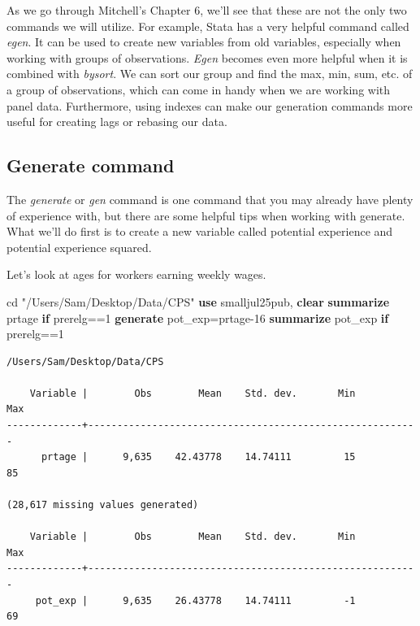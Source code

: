 \documentclass[
]{book}
\newenvironment{Shaded}{\begin{snugshade}}{\end{snugshade}}
\newcommand{\KeywordTok}[1]{\textcolor[rgb]{0.13,0.29,0.53}{\textbf{#1}}}
\newcommand{\NormalTok}[1]{#1}
\newcommand{\StringTok}[1]{\textcolor[rgb]{0.31,0.60,0.02}{#1}}
\begin{document}
As we go through Mitchell's Chapter 6, we'll see that these are not the only two commands we will utilize. For example, Stata has a very helpful command called \emph{egen}. It can be used to create new variables from old variables, especially when working with groups of observations. \emph{Egen} becomes even more helpful when it is combined with \emph{bysort}. We can sort our group and find the max, min, sum, etc. of a group of observations, which can come in handy when we are working with panel data. Furthermore, using indexes can make our generation commands more useful for creating lags or rebasing our data.

\subsection{Generate command}\label{generate-command}

The \emph{generate} or \emph{gen} command is one command that you may already have plenty of experience with, but there are some helpful tips when working with generate. What we'll do first is to create a new variable called potential experience and potential experience squared.

Let's look at ages for workers earning weekly wages.

\begin{Shaded}
\begin{Highlighting}[]
\NormalTok{cd }\StringTok{"/Users/Sam/Desktop/Data/CPS"}
\KeywordTok{use}\NormalTok{ smalljul25pub, }\KeywordTok{clear}
\KeywordTok{summarize}\NormalTok{ prtage }\KeywordTok{if}\NormalTok{ prerelg==1}
\KeywordTok{generate}\NormalTok{ pot\_exp=prtage{-}16}
\KeywordTok{summarize}\NormalTok{ pot\_exp }\KeywordTok{if}\NormalTok{ prerelg==1}
\end{Highlighting}
\end{Shaded}

\begin{verbatim}
/Users/Sam/Desktop/Data/CPS

    Variable |        Obs        Mean    Std. dev.       Min        Max
-------------+---------------------------------------------------------
      prtage |      9,635    42.43778    14.74111         15         85

(28,617 missing values generated)

    Variable |        Obs        Mean    Std. dev.       Min        Max
-------------+---------------------------------------------------------
     pot_exp |      9,635    26.43778    14.74111         -1         69
\end{verbatim}
\end{document}
